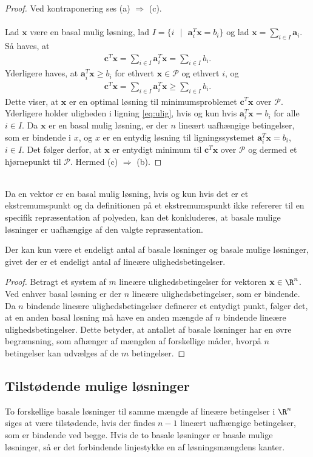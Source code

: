 \begin{proof}
Ved kontraponering ses (a) $\Rightarrow$ (c).
\\\\
%
Lad $\textbf{x}$ være en basal mulig løsning, lad $I = \{i \text{  } | \text{  } \textbf{a}_i^T\textbf{x} = b_i \}$ og lad $\textbf{x}=\sum_{i \in I} \textbf{a}_i$.
Så haves, at
%
\begin{align*}
\textbf{c}^T\textbf{x} = \sum_{i\in I}\textbf{a}_i^T\textbf{x} = \sum_{i\in I}b_i.
\end{align*}
%
Yderligere haves, at $\textbf{a}_i^T\textbf{x} \geq b_i$ for ethvert $\textbf{x} \in \mathcal{P}$ og ethvert $i$, og 
%
\begin{align}\label{eq:ulig}
\textbf{c}^T\textbf{x} = \sum_{i\in I}\textbf{a}_i^T\textbf{x} \geq \sum_{i\in I}b_i.
\end{align}
%
Dette viser, at $\textbf{x}$ er en optimal løsning til minimumsproblemet $\textbf{c}^T\textbf{x}$ over $\mathcal{P}$.
Yderligere holder uligheden i ligning \ref{eq:ulig}, hvis og kun hvis $\textbf{a}_i^T\textbf{x} = b_i$ for alle $i \in I$.
Da $\textbf{x}$ er en basal mulig løsning, er der $n$ lineært uafhængige betingelser, som er bindende i $x$, og $x$ er en entydig løsning til ligningssystemet $\textbf{a}_i^T\textbf{x} = b_i$, $i \in I$.
Det følger derfor, at $\textbf{x}$ er entydigt minimum til $\textbf{c}^T\textbf{x}$ over $\mathcal{P}$ og dermed et hjørnepunkt til $\mathcal{P}$.
Hermed (c) $\Rightarrow$ (b).
%
\end{proof}\\
%
Da en vektor er en basal mulig løsning, hvis og kun hvis det er et ekstremumspunkt og da definitionen på et ekstremumspunkt ikke refererer til en specifik repræsentation af polyeden, kan det konkluderes, at basale mulige løsninger er uafhængige af den valgte repræsentation.
%
\begin{kor}{}{}
Der kan kun være et endeligt antal af basale løsninger og basale mulige løsninger, givet der er et endeligt antal af lineære ulighedsbetingelser.
\end{kor}
%
\begin{proof}
Betragt et system af $m$ lineære ulighedsbetingelser for vektoren $\textbf{x} \in \R^n$.
Ved enhver basal løsning er der $n$ lineære ulighedsbetingelser, som er bindende.
Da $n$ bindende lineære ulighedsbetingelser definerer et entydigt punkt, følger det, at en anden basal løsning må have en anden mængde af $n$ bindende lineære ulighedsbetingelser.
Dette betyder, at antallet af basale løsninger har en øvre begrænsning, som afhænger af mængden af forskellige måder, hvorpå $n$ betingelser kan udvælges af de $m$ betingelser.
\end{proof}
%
\subsection{Tilstødende mulige løsninger}
%
To forskellige basale løsninger til samme mængde af lineære betingelser i $\R^n$ siges at være tilstødende, hvis der findes $n-1$ lineært uafhængige betingelser, som er bindende ved begge. 
Hvis de to basale løsninger er basale mulige løsninger, så er det forbindende linjestykke en af løsningsmængdens kanter.